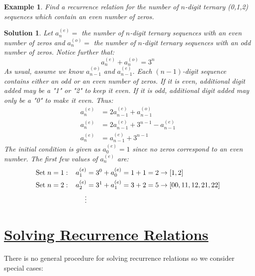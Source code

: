 \documentclass[12pt, letterpaper, onecolumn, conference, final]{IEEEtran}
\theoremstyle{definition}
\theoremstyle{plain}
\newtheorem{example}{Example}[section]
\newtheorem{solution}{Solution}[section]
\begin{document}
\newpage
\begin{example}
Find a recurrence relation for the number of $n$-digit ternary (0,1,2) sequences which contain an even number of zeros.
\end{example}
\begin{solution}
Let $a_n^{(e)} =$ the number of $n$-digit ternary sequences with an even number of zeros and $a_n^{(o)} =$ the number of $n$-digit ternary sequences with an odd number of zeros. Notice further that:
\begin{equation*}
a_n^{(e)} + a_n^{(o)} = 3^n
\end{equation*}
As usual, assume we know $a_{n-1}^{(o)}$ and $a_{n-1}^{(e)}$. Each $(n-1)$-digit sequence contains either an odd or an even number of zeros. If it is even, additional digit added may be a "1" or "2" to keep it even. If it is odd, additional digit added may only be a "0" to make it even. Thus:
\begin{equation*}
\begin{split}
a_n^{(e)} &= 2a_{n-1}^{(e)} + a_{n-1}^{(o)} \\
a_n^{(e)} &= 2a_{n-1}^{(e)} + 3^{n-1} - a_{n-1}^{(e)} \\
a_n^{(e)} &= a_{n-1}^{(e)} + 3^{n-1}
\end{split}
\end{equation*}
The initial condition is given as $a_0^{(e)} = 1$ since no zeros correspond to an even number. The first few values of $a_n^{(e)}$ are:
\begin{equation*}
\begin{split}
&\text{Set} \hspace{.1cm} n = 1: \hspace{.3cm} a_1^{(e)} = 3^0 + a_0^{(e)} = 1 + 1 = 2 \rightarrow [1,2] \\
&\text{Set} \hspace{.1cm} n = 2: \hspace{.3cm} a_2^{(e)} = 3^1 + a_1^{(e)} = 3 + 2 = 5 \rightarrow [00,11,12,21,22] \\ 
& \hspace{2.5cm} \vdots
\end{split}
\end{equation*}
\end{solution}

\vspace{.3cm}
\section{\textbf{\underline{Solving Recurrence Relations}}}
\vspace{.3cm}
\noindent
There is no general procedure for solving recurrence relations so we consider special cases:
\end{document}
